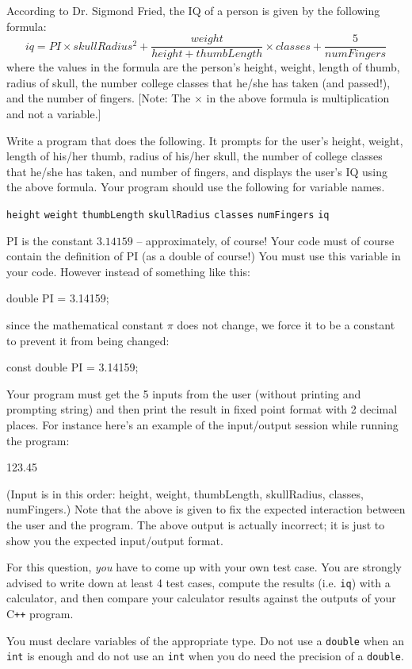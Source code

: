 According to Dr. Sigmond Fried, the IQ of a person is given by the following 
formula:
\[
iq = PI \times skullRadius^2 +
\frac{weight}{height + thumbLength}
\times classes +
\frac{5}{numFingers}
\]
where the values in the formula are the person's height, weight, length of thumb, radius of skull, the
number college classes that he/she has taken (and passed!), 
and the number of fingers. 
[Note: The $\times$ in the above formula is multiplication and not a variable.]

Write a program that does the following. It prompts for the user's height, 
weight, length of his/her
thumb, radius of his/her skull, the number of 
college classes that he/she has taken, and number of fingers,
and displays the
user's IQ using the above formula.
Your program should use the following for variable names.
\begin{tightlist}
\li \verb!height!
\li \verb!weight!
\li \verb!thumbLength!
\li \verb!skullRadius!
\li \verb!classes!
\li \verb!numFingers!
\li \verb!iq!
\end{tightlist}
PI is the constant $3.14159$  -- approximately, of course! 
Your code must of course contain the definition of PI 
(as a double of
course!) 
You must use this variable in your code.
However instead of something like this:
\begin{console}
double PI = 3.14159;
\end{console}
since the mathematical constant  $\pi$ does not change,
we force it to be a constant 
to prevent it from being changed:
\begin{console}
const double PI = 3.14159;
\end{console}


Your program must get the 5 inputs from the user 
(without printing and prompting string) and then print
the result in fixed point format with 2 decimal places. 
For instance here's an example of the
input/output session while running the program:
\begin{console}[commandchars=\\\{\}]
123.45
\end{console}
(Input is in this order: height, weight, thumbLength, skullRadius, classes, 
numFingers.) 
Note that the above is given to fix the expected interaction between the user 
and the program. 
The above output is actually incorrect; it is just to show you the
expected input/output format.

For this question, \textit{you} have to come up with your own test case.
You are strongly advised to write down at least 4 test cases, 
compute the results (i.e. \verb!iq!) with a
calculator, and then compare your calculator results against 
the outputs of your C\texttt{++} program.

You must declare variables of the appropriate type. 
Do not use a \verb!double! when an \verb!int! is enough and
do not use an \verb!int! when you do need the precision of a \verb!double!.
